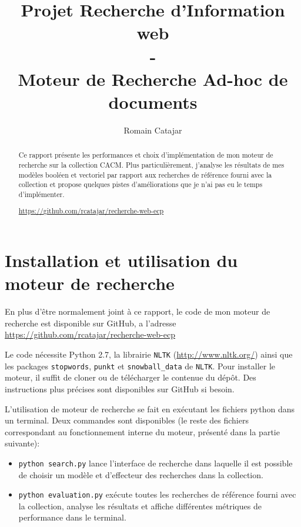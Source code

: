 \documentclass{article}
\begin{document}
\title{Projet Recherche d'Information web \\- \\
Moteur de Recherche Ad-hoc de documents}
\author{Romain Catajar}

\maketitle

\begin{abstract}
Ce rapport présente les performances et choix d’implémentation de mon moteur de recherche sur la collection CACM. Plus particulièrement, j'analyse les résultats de mes modèles booléen et vectoriel par rapport aux recherches de référence fourni avec la collection et propose quelques pistes d’améliorations que je n'ai pas eu le temps d’implémenter.
\begin{center}
\url{https://github.com/rcatajar/recherche-web-ecp}
\end{center}
\end{abstract}


\section{Installation et utilisation du moteur de recherche}
En plus d’être normalement joint à ce rapport, le code de mon moteur de recherche est disponible sur GitHub, a l'adresse \url{https://github.com/rcatajar/recherche-web-ecp}


Le code nécessite Python 2.7, la librairie \texttt{NLTK} (\url{http://www.nltk.org/}) ainsi que les packages \texttt{stopwords}, \texttt{punkt} et \texttt{snowball\_data} de \texttt{NLTK}. Pour installer le moteur, il suffit de cloner ou de télécharger le contenue du dépôt. Des instructions plus précises sont disponibles sur GitHub si besoin.


L'utilisation de moteur de recherche se fait en exécutant les fichiers python dans un terminal. Deux commandes sont disponibles (le reste des fichiers correspondant au fonctionnement interne du moteur, présenté dans la partie suivante):
\begin{itemize}
    \item \texttt{python search.py} lance l'interface de recherche dans laquelle il est possible de choisir un modèle et d'effecteur des recherches dans la collection.
    \item \texttt{python evaluation.py} exécute toutes les recherches de référence fourni avec la collection, analyse les résultats et affiche différentes métriques de performance dans le terminal.
\end{itemize}
\end{document}
